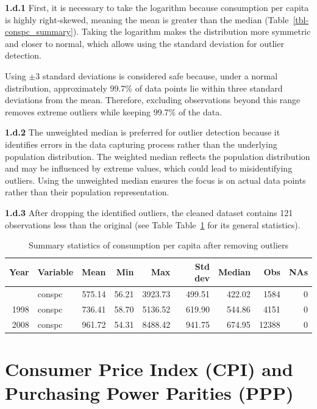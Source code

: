 \documentclass[
  letterpaper,
  DIV=11,
  numbers=noendperiod]{scrartcl}
\begin{document}
\textbf{1.d.1} First, it is necessary to take the logarithm because
consumption per capita is highly right-skewed, meaning the mean is
greater than the median (Table~\ref{tbl-conspc_summary}). Taking the
logarithm makes the distribution more symmetric and closer to normal,
which allows using the standard deviation for outlier detection.

Using \(\pm 3\) standard deviations is considered safe because, under a
normal distribution, approximately 99.7\% of data points lie within
three standard deviations from the mean. Therefore, excluding
observations beyond this range removes extreme outliers while keeping
99.7\% of the data.

\textbf{1.d.2} The unweighted median is preferred for outlier detection
because it identifies errors in the data capturing process rather than
the underlying population distribution. The weighted median reflects the
population distribution and may be influenced by extreme values, which
could lead to misidentifying outliers. Using the unweighted median
ensures the focus is on actual data points rather than their population
representation.

\textbf{1.d.3} After dropping the identified outliers, the cleaned
dataset contains 121 observations less than the original (see Table
Table~\ref{tbl-conspc_summary_cleaned} for its general statistics).

{

\begin{longtable}[]{@{}rlrrrrrrr@{}}

\caption{\label{tbl-conspc_summary_cleaned}Summary statistics of
consumption per capita after removing outliers}

\tabularnewline

\toprule\noalign{}
Year & Variable & Mean & Min & Max & Std dev & Median & Obs & NAs \\
\midrule\noalign{}
\endhead
\bottomrule\noalign{}
\endlastfoot
1987 & conspc & 575.14 & 56.21 & 3923.73 & 499.51 & 422.02 & 1584 & 0 \\
1998 & conspc & 736.41 & 58.70 & 5136.52 & 619.90 & 544.86 & 4151 & 0 \\
2008 & conspc & 961.72 & 54.31 & 8488.42 & 941.75 & 674.95 & 12388 &
0 \\

\end{longtable}

}

\section{Consumer Price Index (CPI) and Purchasing Power Parities
(PPP)}\label{consumer-price-index-cpi-and-purchasing-power-parities-ppp}
\end{document}
